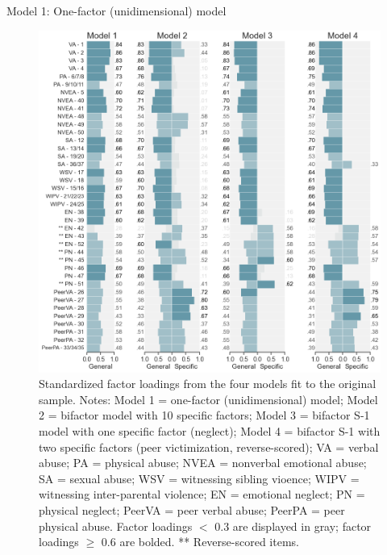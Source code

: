 \documentclass[letterpaper,man,natbib,noextraspace,floatsintext,longtable,12pt]{apa6}
\makeatletter
\renewcommand{\subsubsection}{\@startsection{subsubsection}{3}
  {\z@}%
  {\b@level@two@skip}{\e@level@two@skip}%
  {\normalfont\normalsize\bfseries}}
\makeatother
\begin{document}
\subsubsection{Model 1: One-factor (unidimensional) model}

\begin{figure}[tp]
    \centering
    \includegraphics[width=1.1\textwidth,center]{figures/fig02.png}
    \captionsetup{width=1.1\textwidth}
    \caption{Standardized factor loadings from the four models fit to the original sample. Notes: Model 1 = one-factor (unidimensional) model; Model 2 = bifactor model with 10 specific factors; Model 3 = bifactor S-1 model with one specific factor (neglect); Model 4 = bifactor S-1 with two specific factors (peer victimization, reverse-scored); VA = verbal abuse; PA = physical abuse; NVEA = nonverbal emotional abuse; SA = sexual abuse; WSV = witnessing sibling vioence; WIPV = witnessing inter-parental violence; EN = emotional neglect; PN = physical neglect; PeerVA = peer verbal abuse; PeerPA = peer physical abuse. Factor loadings $<$ 0.3 are displayed in gray; factor loadings $\geq$ 0.6 are bolded.  ** Reverse-scored items.}
    \label{fig:loadings_original}
\end{figure}
\end{document}
